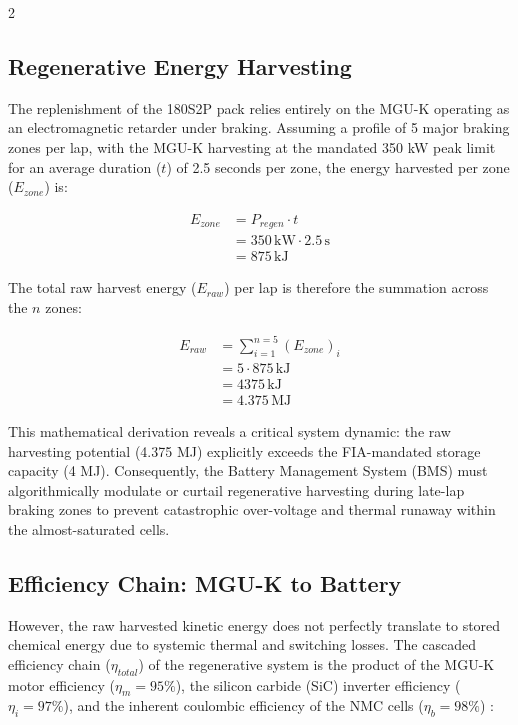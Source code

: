 \begin{multicols}{2}
\subsection{Regenerative Energy Harvesting}

The replenishment of the 180S2P pack relies entirely on the MGU-K operating as an electromagnetic retarder under braking. Assuming a profile of 5 major braking zones per lap, with the MGU-K harvesting at the mandated 350 kW peak limit for an average duration ($t$) of 2.5 seconds per zone, the energy harvested per zone ($E_{zone}$) is:

\begin{equation} \label{eq:energy_zone}
\begin{split}
E_{zone} &= P_{regen} \cdot t \\
&= 350\,\mathrm{kW} \cdot 2.5\,\mathrm{s} \\
&= 875\,\mathrm{kJ}
\end{split}
\end{equation}

The total raw harvest energy ($E_{raw}$) per lap is therefore the summation across the $n$ zones:

\begin{equation} \label{eq:total_harvest}
\begin{split}
E_{raw} &= \sum_{i=1}^{n=5} (E_{zone})_i \\
&= 5 \cdot 875\,\mathrm{kJ} \\
&= 4375\,\mathrm{kJ} \\
&= 4.375\,\mathrm{MJ}
\end{split}
\end{equation}

This mathematical derivation reveals a critical system dynamic: the raw harvesting potential (4.375 MJ) explicitly exceeds the FIA-mandated storage capacity (4 MJ). Consequently, the Battery Management System (BMS) must algorithmically modulate or curtail regenerative harvesting during late-lap braking zones to prevent catastrophic over-voltage and thermal runaway within the almost-saturated cells.

\subsection{Efficiency Chain: MGU-K to Battery}

However, the raw harvested kinetic energy does not perfectly translate to stored chemical energy due to systemic thermal and switching losses. The cascaded efficiency chain ($\eta_{total}$) of the regenerative system is the product of the MGU-K motor efficiency ($\eta_m = 95\%$), the silicon carbide (SiC) inverter efficiency ($\eta_i = 97\%$), and the inherent coulombic efficiency of the NMC cells ($\eta_b = 98\%$) \cite{battery_thermal_lit}:


\end{multicols}
